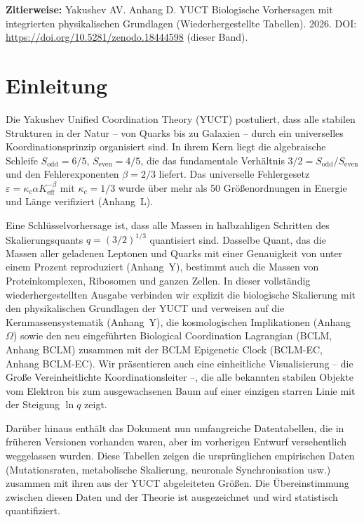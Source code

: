 \documentclass[11pt,a4paper]{article}
\begin{document}
	\vspace{0.1cm}
	\noindent
	\textbf{Zitierweise:} Yakushev AV. Anhang D. YUCT Biologische Vorhersagen mit integrierten physikalischen Grundlagen (Wiederhergestellte Tabellen). 2026. DOI: \url{https://doi.org/10.5281/zenodo.18444598} (dieser Band).
	
	\tableofcontents
	\newpage
	
	\section{Einleitung}
	
	Die Yakushev Unified Coordination Theory (YUCT) postuliert, dass alle stabilen Strukturen in der Natur – von Quarks bis zu Galaxien – durch ein universelles Koordinationsprinzip organisiert sind. In ihrem Kern liegt die algebraische Schleife \(S_{\mathrm{odd}} = 6/5\), \(S_{\mathrm{even}} = 4/5\), die das fundamentale Verhältnis \(3/2 = S_{\mathrm{odd}}/S_{\mathrm{even}}\) und den Fehlerexponenten \(\beta = 2/3\) liefert. Das universelle Fehlergesetz \(\varepsilon = \kappa_c \alpha K_{\mathrm{eff}}^{-\beta}\) mit \(\kappa_c = 1/3\) wurde über mehr als 50 Größenordnungen in Energie und Länge verifiziert (Anhang~L).
	
	Eine Schlüsselvorhersage ist, dass alle Massen in halbzahligen Schritten des Skalierungsquants \(q = (3/2)^{1/3}\) quantisiert sind. Dasselbe Quant, das die Massen aller geladenen Leptonen und Quarks mit einer Genauigkeit von unter einem Prozent reproduziert (Anhang~Y), bestimmt auch die Massen von Proteinkomplexen, Ribosomen und ganzen Zellen. In dieser vollständig wiederhergestellten Ausgabe verbinden wir explizit die biologische Skalierung mit den physikalischen Grundlagen der YUCT und verweisen auf die Kernmassensystematik (Anhang~Y), die kosmologischen Implikationen (Anhang~\(\Omega\)) sowie den neu eingeführten Biological Coordination Lagrangian (BCLM, Anhang BCLM) zusammen mit der BCLM Epigenetic Clock (BCLM-EC, Anhang BCLM-EC). Wir präsentieren auch eine einheitliche Visualisierung – die Große Vereinheitlichte Koordinationsleiter –, die alle bekannten stabilen Objekte vom Elektron bis zum ausgewachsenen Baum auf einer einzigen starren Linie mit der Steigung \(\ln q\) zeigt.
	
	Darüber hinaus enthält das Dokument nun umfangreiche Datentabellen, die in früheren Versionen vorhanden waren, aber im vorherigen Entwurf versehentlich weggelassen wurden. Diese Tabellen zeigen die ursprünglichen empirischen Daten (Mutationsraten, metabolische Skalierung, neuronale Synchronisation usw.) zusammen mit ihren aus der YUCT abgeleiteten Größen. Die Übereinstimmung zwischen diesen Daten und der Theorie ist ausgezeichnet und wird statistisch quantifiziert.
	
\end{document}
